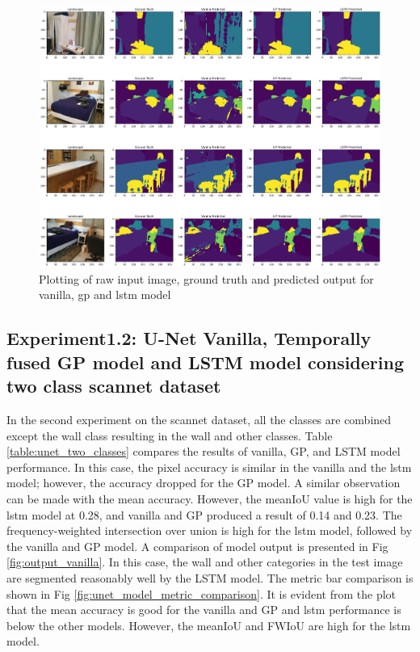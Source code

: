 	\begin{figure}
		\centering
		\includegraphics[width=16cm]{images/unet_scannet_all_classes.png}
		\caption{Plotting of raw input image, ground truth and predicted output for vanilla, gp and lstm model}
		\label{fig:unet_model}
	\end{figure}

	\newpage
		
    \subsection{Experiment1.2: U-Net Vanilla, Temporally fused GP model and LSTM model considering two class scannet dataset}
	In the second experiment on the scannet dataset, all the classes are combined except the wall class resulting in the wall and other classes. Table \ref{table:unet_two_classes} compares the results of vanilla, GP, and LSTM model performance. In this case, the pixel accuracy is similar in the vanilla and the lstm model; however, the accuracy dropped for the GP model. A similar observation can be made with the mean accuracy. However, the meanIoU value is high for the lstm model at 0.28, and vanilla and GP produced a result of 0.14 and 0.23. The frequency-weighted intersection over union is high for the lstm model, followed by the vanilla and GP model. A comparison of model output is presented in Fig \ref{fig:output_vanilla}. In this case, the wall and other categories in the test image are segmented reasonably well by the LSTM model. The metric bar comparison is shown in Fig \ref{fig:unet_model_metric_comparison}. It is evident from the plot that the mean accuracy is good for the vanilla and GP and lstm performance is below the other models. However, the meanIoU and FWIoU are high for the lstm model.

